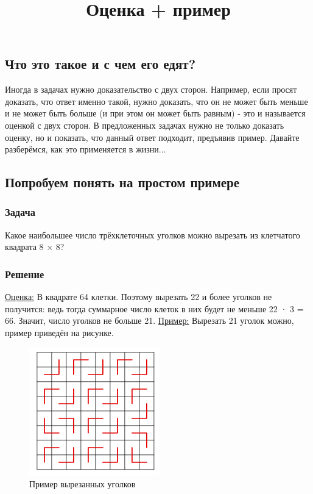 \documentclass[a4paper,12pt]{article}
\title{Оценка + пример}
\begin{document}
\maketitle

\subsection*{Что это такое и с чем его едят?}
Иногда в задачах нужно доказательство с двух сторон. Например, если просят доказать, что ответ именно такой, нужно доказать, что он не может быть меньше и не может быть больше (и при этом он может быть равным) - это и называется оценкой с двух сторон. В предложенных задачах нужно не только доказать оценку, но и показать, что данный ответ подходит, предъявив пример. Давайте разберёмся, как это применяется в жизни...

    \subsection*{Попробуем понять на простом примере}
        \subsubsection*{Задача}
            Какое наибольшее число трёхклеточных уголков можно вырезать из клетчатого квадрата 8 × 8?
        
        \subsubsection*{Решение} 
            \underline{Оценка:} В квадрате 64 клетки. Поэтому вырезать 22 и более уголков не получится: ведь тогда суммарное число клеток в них будет не меньше 22 · 3 = 66. Значит, число уголков не больше 21. 
            \underline{Пример:} Вырезать 21 уголок можно, пример приведён на рисунке.
                \begin{figure}[h]
                    \centering
                    \includegraphics[width=0.35\linewidth]{example.png}
                    \caption{Пример вырезанных уголков}
                    \label{fig:corner-example}
                \end{figure}
\end{document}
